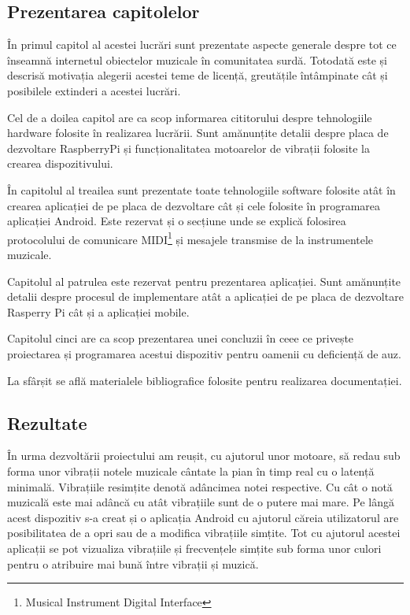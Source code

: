 \documentclass[../IoMusT.tex]{subfiles}
\begin{document}
\subsection{Prezentarea capitolelor}
În primul capitol al acestei lucrări sunt prezentate aspecte generale des\-pre tot ce înseamnă internetul obiectelor muzicale în comunitatea surdă. Tot\-o\-da\-tă este și descrisă motivația alegerii acestei teme de licență, greutățile întâmpinate cât și posibilele extinderi a acestei lucrări.
\\
\par Cel de a doilea capitol are ca scop informarea cititorului despre tehnologiile hardware folosite în realizarea lucrării. Sunt amănunțite detalii despre placa de dezvoltare RaspberryPi și funcționalitatea motoarelor de vibrații folosite la crearea dispozitivului.
\\
\par În capitolul al treailea sunt prezentate toate tehnologiile software folosite atât în crearea aplicației de pe placa de dezvoltare cât și cele folosite în programarea aplicației Android. Este rezervat și o secțiune unde se explică folosirea protocolului de comunicare MIDI\footnote{Musical Instrument Digital Interface} și mesajele transmise de la instrumentele muzicale.
\\
\par Capitolul al patrulea este rezervat pentru prezentarea aplicației. Sunt amănunțite detalii despre procesul de implementare atât a aplicației de pe placa de dezvoltare Rasperry Pi cât și a aplicației mobile.
\\
\par Capitolul cinci are ca scop prezentarea unei concluzii în ceee ce privește proiectarea și programarea acestui dispozitiv pentru oamenii cu deficiență de auz.
\\
\par La sfârșit se află materialele bibliografice folosite pentru realizarea do\-cu\-men\-ta\-ți\-ei.
\subsection{Rezultate}
În urma dezvoltării proiectului am reușit, cu ajutorul unor motoare, să redau sub forma unor vibrații notele muzicale cântate la pian în timp real cu o latență minimală. Vibrațiile resimțite denotă adâncimea notei respective. Cu cât o notă muzicală este mai adâncă cu atât vibrațiile sunt de o putere mai mare. Pe lângă acest dispozitiv s-a creat și o aplicația Android cu ajutorul căreia utilizatorul are posibilitatea de a opri sau de a modifica vibrațiile simțite. Tot cu ajutorul acestei aplicații se pot vizualiza vibrațiile și frecvențele simțite sub forma unor culori pentru o atribuire mai bună între vibrații și muzică. 
\end{document}

